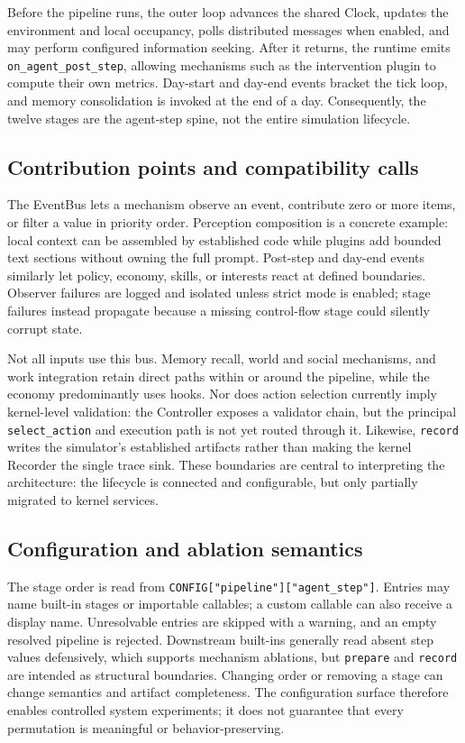 Before the pipeline runs, the outer loop advances the shared Clock, updates the
environment and local occupancy, polls distributed messages when enabled, and
may perform configured information seeking.  After it returns, the runtime
emits \texttt{on\_agent\_post\_step}, allowing mechanisms such as the
intervention plugin to compute their own metrics.  Day-start and day-end
events bracket the tick loop, and memory consolidation is invoked at the end
of a day.  Consequently, the twelve stages are the agent-step spine, not the
entire simulation lifecycle.

\subsection{Contribution points and compatibility calls}

The EventBus lets a mechanism observe an event, contribute zero or more items,
or filter a value in priority order.  Perception composition is a concrete
example: local context can be assembled by established code while plugins add
bounded text sections without owning the full prompt.  Post-step and day-end
events similarly let policy, economy, skills, or interests react at defined
boundaries.  Observer failures are logged and isolated unless strict mode is
enabled; stage failures instead propagate because a missing control-flow stage
could silently corrupt state.

Not all inputs use this bus.  Memory recall, world and social mechanisms, and
work integration retain direct paths within or around the pipeline, while the
economy predominantly uses hooks.  Nor does action selection currently imply
kernel-level validation: the Controller exposes a validator chain, but the
principal \texttt{select\_action} and execution path is not yet routed through
it.  Likewise, \texttt{record} writes the simulator's established artifacts
rather than making the kernel Recorder the single trace sink.  These boundaries
are central to interpreting the architecture: the lifecycle is connected and
configurable, but only partially migrated to kernel services.

\subsection{Configuration and ablation semantics}

The stage order is read from \texttt{CONFIG["pipeline"]["agent\_step"]}.
Entries may name built-in stages or importable callables; a custom callable can
also receive a display name.  Unresolvable entries are skipped with a warning,
and an empty resolved pipeline is rejected.  Downstream built-ins generally
read absent step values defensively, which supports mechanism ablations, but
\texttt{prepare} and \texttt{record} are intended as structural boundaries.
Changing order or removing a stage can change semantics and artifact
completeness.  The configuration surface therefore enables controlled system
experiments; it does not guarantee that every permutation is meaningful or
behavior-preserving.
